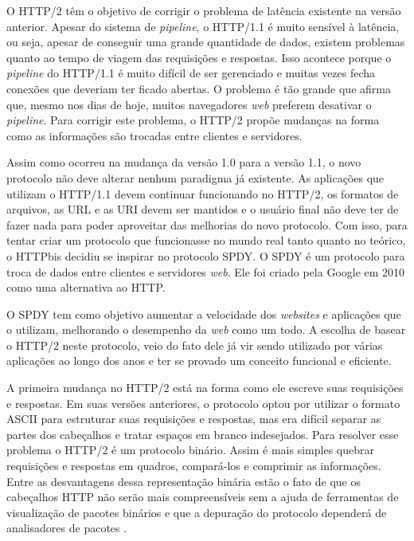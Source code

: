 O HTTP/2 têm o objetivo de corrigir o problema de latência existente na versão anterior. Apesar do sistema de \textit{pipeline}, o HTTP/1.1 é muito sensível à latência, ou seja, apesar de conseguir uma grande quantidade de dados, existem problemas quanto ao tempo de viagem das requisições e respostas. Isso acontece porque o \textit{pipeline} do HTTP/1.1 é muito difícil de ser gerenciado e muitas vezes fecha conexões que deveriam ter ficado abertas. O problema é tão grande que  afirma que, mesmo nos dias de hoje, muitos navegadores \textit{web} preferem desativar o \textit{pipeline}. Para corrigir este problema, o HTTP/2 propõe mudanças na forma como as informações são trocadas entre clientes e servidores.

Assim como ocorreu na mudança da versão 1.0 para a versão 1.1, o novo protocolo não deve alterar nenhum paradigma já existente. As aplicações que utilizam o HTTP/1.1 devem continuar funcionando no HTTP/2, os formatos de arquivos, as URL e as URI devem ser mantidos e o usuário final não deve ter de fazer nada para poder aproveitar das melhorias do novo protocolo. Com isso, para tentar criar um protocolo que funcionasse no mundo real tanto quanto no teórico, o HTTPbis decidiu se inspirar no protocolo SPDY. O SPDY \cite{SPDY} é um protocolo para troca de dados entre clientes e servidores \textit{web}. Ele foi criado pela Google em 2010 como uma alternativa ao HTTP.

O SPDY tem como objetivo aumentar a velocidade dos \textit{websites} e aplicações que o utilizam, melhorando o desempenho da \textit{web} como um todo. A escolha de basear o HTTP/2 neste protocolo, veio do fato dele já vir sendo utilizado por várias aplicações ao longo dos anos e ter se provado um conceito funcional e eficiente.

A primeira mudança no HTTP/2 está na forma como ele escreve suas requisições e respostas. Em suas versões anteriores, o protocolo optou por utilizar o formato ASCII para estruturar suas requisições e respostas, mas era difícil separar as partes dos cabeçalhos e tratar espaços em branco indesejados. Para resolver esse problema o HTTP/2 é um protocolo binário. Assim é mais simples quebrar requisições e respostas em quadros, compará-los e comprimir as informações. Entre as desvantagens dessa representação binária estão o fato de que os cabeçalhos HTTP não serão mais compreensíveis sem a ajuda de ferramentas de visualização de pacotes binários e que a depuração do protocolo dependerá de analisadores de pacotes \cite{HTTP2Explained}.

